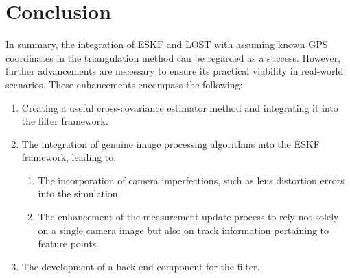 \chapter{Conclusion}\label{chap:conclusion}

In summary, the integration of ESKF and LOST with assuming known GPS coordinates in the triangulation method can be regarded as a success. However, further advancements are necessary to ensure its practical viability in real-world scenarios. These enhancements encompass the following:
\begin{enumerate}
    \item Creating a useful cross-covariance estimator method and integrating it into the filter framework.
    \item The integration of genuine image processing algorithms into the ESKF framework, leading to:
    \begin{enumerate}
        \item The incorporation of camera imperfections, such as lens distortion errors into the simulation.
        \item The enhancement of the measurement update process to rely not solely on a single camera image but also on track information pertaining to feature points.
    \end{enumerate}
    \item The development of a back-end component for the filter.
\end{enumerate}